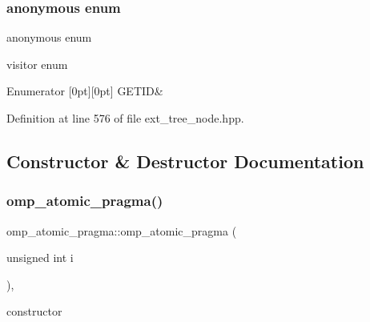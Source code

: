 \subsubsection{\texorpdfstring{anonymous enum}{anonymous enum}}
{\footnotesize\ttfamily anonymous enum}



visitor enum 

\begin{DoxyEnumFields}{Enumerator}
[0pt][0pt]{}\mbox{\label{structomp__atomic__pragma_a57513cdbeb4a59dae45b8effb61265b3a95836c18b5264ed1eae6af2cd2d93e4a}} 
G\+E\+T\+ID&\\
\hline

\end{DoxyEnumFields}


Definition at line 576 of file ext\+\_\+tree\+\_\+node.\+hpp.



\subsection{Constructor \& Destructor Documentation}
\mbox{\label{structomp__atomic__pragma_a2c78dee8e114b16af1d44a6a5ddd4940}} 
\subsubsection{\texorpdfstring{omp\+\_\+atomic\+\_\+pragma()}{omp\_atomic\_pragma()}}
{\footnotesize\ttfamily omp\+\_\+atomic\+\_\+pragma\+::omp\+\_\+atomic\+\_\+pragma (\begin{DoxyParamCaption}\item[{unsigned int}]{i }\end{DoxyParamCaption})\hspace{0.3cm}{\ttfamily [inline]}, {\ttfamily [explicit]}}



constructor 



